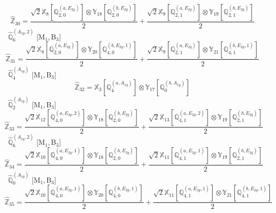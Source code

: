 \documentclass[fleqn,10pt,landscape]{article}
\begin{document}
\begin{itemize}
\begin{dmath*}
\hat{\mathbb{Z}}_{30}=\frac{\sqrt{2} \mathbb{X}_{8}[\mathbb{Q}_{2,0}^{(a,E_{2g})}] \otimes\mathbb{Y}_{18}[\mathbb{Q}_{2,0}^{(b,E_{2g})}]}{2} + \frac{\sqrt{2} \mathbb{X}_{9}[\mathbb{Q}_{2,1}^{(a,E_{2g})}] \otimes\mathbb{Y}_{19}[\mathbb{Q}_{2,1}^{(b,E_{2g})}]}{2}
\end{dmath*}
\vspace{4mm}
\noindent {} $\,\,\,\hat{\mathbb{Q}}_{6}^{(A_{1g},2)}$ [M$_{1}$,\,B$_{3}$]
\begin{dmath*}
\hat{\mathbb{Z}}_{31}=\frac{\sqrt{2} \mathbb{X}_{8}[\mathbb{Q}_{2,0}^{(a,E_{2g})}] \otimes\mathbb{Y}_{20}[\mathbb{Q}_{4,0}^{(b,E_{2g},1)}]}{2} + \frac{\sqrt{2} \mathbb{X}_{9}[\mathbb{Q}_{2,1}^{(a,E_{2g})}] \otimes\mathbb{Y}_{21}[\mathbb{Q}_{4,1}^{(b,E_{2g},1)}]}{2}
\end{dmath*}
\vspace{4mm}
\noindent {} $\,\,\,\hat{\mathbb{Q}}_{4}^{(A_{1g})}$ [M$_{1}$,\,B$_{3}$]
\begin{dmath*}
\hat{\mathbb{Z}}_{32}=\mathbb{X}_{3}[\mathbb{Q}_{4}^{(a,A_{1g})}] \otimes\mathbb{Y}_{17}[\mathbb{Q}_{0}^{(b,A_{1g})}]
\end{dmath*}
\vspace{4mm}
\noindent {} $\,\,\,\hat{\mathbb{Q}}_{2}^{(A_{1g})}$ [M$_{1}$,\,B$_{3}$]
\begin{dmath*}
\hat{\mathbb{Z}}_{33}=\frac{\sqrt{2} \mathbb{X}_{12}[\mathbb{Q}_{4,0}^{(a,E_{2g},2)}] \otimes\mathbb{Y}_{18}[\mathbb{Q}_{2,0}^{(b,E_{2g})}]}{2} + \frac{\sqrt{2} \mathbb{X}_{13}[\mathbb{Q}_{4,1}^{(a,E_{2g},2)}] \otimes\mathbb{Y}_{19}[\mathbb{Q}_{2,1}^{(b,E_{2g})}]}{2}
\end{dmath*}
\vspace{4mm}
\noindent {} $\,\,\,\hat{\mathbb{Q}}_{6}^{(A_{1g},2)}$ [M$_{1}$,\,B$_{3}$]
\begin{dmath*}
\hat{\mathbb{Z}}_{34}=\frac{\sqrt{2} \mathbb{X}_{10}[\mathbb{Q}_{4,0}^{(a,E_{2g},1)}] \otimes\mathbb{Y}_{18}[\mathbb{Q}_{2,0}^{(b,E_{2g})}]}{2} + \frac{\sqrt{2} \mathbb{X}_{11}[\mathbb{Q}_{4,1}^{(a,E_{2g},1)}] \otimes\mathbb{Y}_{19}[\mathbb{Q}_{2,1}^{(b,E_{2g})}]}{2}
\end{dmath*}
\vspace{4mm}
\noindent {} $\,\,\,\hat{\mathbb{Q}}_{0}^{(A_{1g})}$ [M$_{1}$,\,B$_{3}$]
\begin{dmath*}
\hat{\mathbb{Z}}_{35}=\frac{\sqrt{2} \mathbb{X}_{10}[\mathbb{Q}_{4,0}^{(a,E_{2g},1)}] \otimes\mathbb{Y}_{20}[\mathbb{Q}_{4,0}^{(b,E_{2g},1)}]}{2} + \frac{\sqrt{2} \mathbb{X}_{11}[\mathbb{Q}_{4,1}^{(a,E_{2g},1)}] \otimes\mathbb{Y}_{21}[\mathbb{Q}_{4,1}^{(b,E_{2g},1)}]}{2}

\end{dmath*}
\end{itemize}
\end{document}
